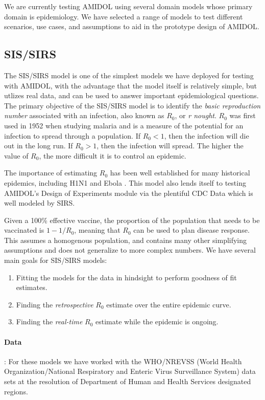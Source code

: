 \documentclass[11pt]{article}
\newcommand{\amidol}{\textsc{AMIDOL}}
\begin{document}
We are currently testing \amidol{} using several domain models whose primary domain is epidemiology.  We have selected a range of models to test different scenarios, use cases, and assumptions to aid in the prototype design of \amidol{}.

\subsection{SIS/SIRS}

The SIS/SIRS model is one of the simplest models we have deployed for testing with \amidol{}, with the advantage that the model itself is relatively simple, but utlizes real data, and can be used to answer important epidemiological questions.  The primary objective of the SIS/SIRS model is to identify the \emph{basic reproduction number} associated with an infection, also known as $R_0$, or \emph{r nought}.  $R_0$ was first used in 1952 when studying malaria and is a measure of the potential for an infection to spread through a population.  If $R_0 < 1$, then the infection will die out in the long run.  If $R_0 > 1$, then the infection will spread.  The higher the value of $R_0$, the more difficult it is to control an epidemic.

The importance of estimating $R_0$ has been well established for many historical epidemics, including H1N1 \cite{fraser2009pandemic} and Ebola \cite{fisman2014early}.  This model also lends itself to testing \amidol{}'s Design of Experiments module via the plentiful CDC Data \cite{cdc2019fluview} which is well modeled by SIRS.

Given a 100\% effective vaccine, the proportion of the population that needs to be vaccinated is $1 - 1/R_0$, meaning that $R_0$ can be used to plan disease response.  This assumes a homogenous population, and contains many other simplifying assumptions and does not generalize to more complex numbers.  We have several main goals for SIS/SIRS models:

\begin{enumerate}
\item Fitting the models for the data in hindsight to perform goodness of fit estimates.
\item Finding the \emph{retrospective} $R_0$ estimate over the entire epidemic curve.
\item Finding the \emph{real-time} $R_0$ estimate while the epidemic is ongoing.
\end{enumerate}

\paragraph{Data}: For these models we have worked with the WHO/NREVSS (World Health Organization/National Respiratory and Enteric Virus Surveillance System) data sets at the resolution of Department of Human and Health Services designated regions.
\end{document}
